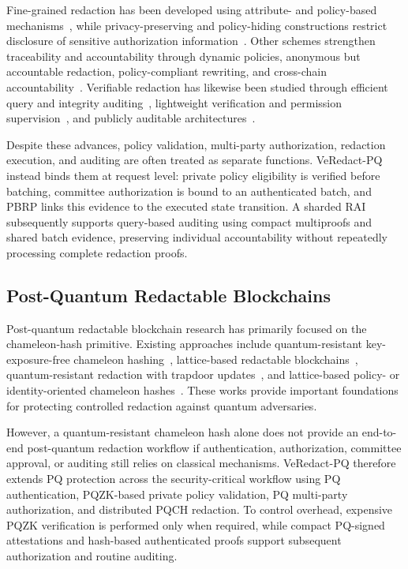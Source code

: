 \documentclass[lettersize,journal]{IEEEtran}
\begin{document}
    Fine-grained redaction has been developed using attribute- and
    policy-based mechanisms~\cite{ref8,ref15}, while privacy-preserving and
    policy-hiding constructions restrict disclosure of sensitive
    authorization information~\cite{ref4,ref18,ref24,ref31,ref34}. Other schemes
    strengthen traceability and accountability through dynamic policies,
    anonymous but accountable redaction, policy-compliant rewriting, and
    cross-chain accountability~\cite{ref25,ref28,ref29,ref32,ref35}. Verifiable
    redaction has likewise been studied through efficient query and
    integrity auditing~\cite{ref13}, lightweight verification and
    permission supervision~\cite{ref20}, and publicly auditable
    architectures~\cite{ref33}.
    
    Despite these advances, policy validation, multi-party authorization,
    redaction execution, and auditing are often treated as separate
    functions. VeRedact-PQ instead binds them at request level: private
    policy eligibility is verified before batching, committee authorization
    is bound to an authenticated batch, and PBRP links this evidence to the
    executed state transition. A sharded RAI subsequently supports
    query-based auditing using compact multiproofs and shared batch
    evidence, preserving individual accountability without repeatedly
    processing complete redaction proofs.
    
    \subsection{Post-Quantum Redactable Blockchains}
    
    Post-quantum redactable blockchain research has primarily focused on
    the chameleon-hash primitive. Existing approaches include
    quantum-resistant key-exposure-free chameleon hashing~\cite{ref11},
    lattice-based redactable blockchains~\cite{ref10}, quantum-resistant
    redaction with trapdoor updates~\cite{ref17}, and lattice-based policy-
    or identity-oriented chameleon hashes~\cite{ref18,ref37}. These works
    provide important foundations for protecting controlled redaction
    against quantum adversaries.
    
    However, a quantum-resistant chameleon hash alone does not provide an
    end-to-end post-quantum redaction workflow if authentication,
    authorization, committee approval, or auditing still relies on
    classical mechanisms. VeRedact-PQ therefore extends PQ protection
    across the security-critical workflow using PQ authentication,
    PQZK-based private policy validation, PQ multi-party authorization, and
    distributed PQCH redaction. To control overhead, expensive PQZK
    verification is performed only when required, while compact PQ-signed
    attestations and hash-based authenticated proofs support subsequent
    authorization and routine auditing.
    
\end{document}
